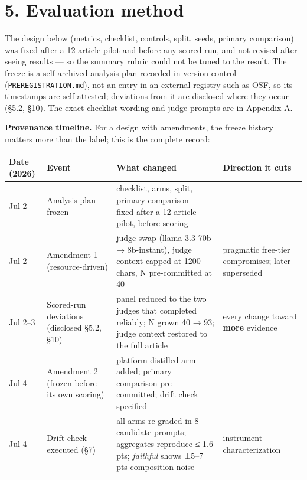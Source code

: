 \documentclass[11pt]{article}
\begin{document}
\section{5. Evaluation method}\label{evaluation-method}

The design below (metrics, checklist, controls, split, seeds, primary
comparison) was fixed after a 12-article pilot and before any scored
run, and not revised after seeing results --- so the summary rubric
could not be tuned to the result. The freeze is a self-archived analysis
plan recorded in version control (\texttt{PREREGISTRATION.md}), not an
entry in an external registry such as OSF, so its timestamps are
self-attested; deviations from it are disclosed where they occur (§5.2,
§10). The exact checklist wording and judge prompts are in Appendix A.

\textbf{Provenance timeline.} For a design with amendments, the freeze
history matters more than the label; this is the complete record:

\begin{longtable}[]{@{}
  >{\raggedright\arraybackslash}p{}
  >{\raggedright\arraybackslash}p{}
  >{\raggedright\arraybackslash}p{}
  >{\raggedright\arraybackslash}p{}@{}}
\toprule\noalign{}
\begin{minipage}[b]{\linewidth}\raggedright
Date (2026)
\end{minipage} & \begin{minipage}[b]{\linewidth}\raggedright
Event
\end{minipage} & \begin{minipage}[b]{\linewidth}\raggedright
What changed
\end{minipage} & \begin{minipage}[b]{\linewidth}\raggedright
Direction it cuts
\end{minipage} \\
\midrule\noalign{}
\endhead
\bottomrule\noalign{}
\endlastfoot
Jul 2 & Analysis plan frozen & checklist, arms, split, primary
comparison --- fixed after a 12-article pilot, before scoring & --- \\
Jul 2 & Amendment 1 (resource-driven) & judge swap (llama-3.3-70b →
8b-instant), judge context capped at 1200 chars, N pre-committed at 40 &
pragmatic free-tier compromises; later superseded \\
Jul 2--3 & Scored-run deviations (disclosed §5.2, §10) & panel reduced
to the two judges that completed reliably; N grown 40 → 93; judge
context restored to the full article & every change toward \textbf{more}
evidence \\
Jul 4 & Amendment 2 (frozen before its own scoring) & platform-distilled
arm added; primary comparison pre-committed; drift check specified &
--- \\
Jul 4 & Drift check executed (§7) & all arms re-graded in 8-candidate
prompts; aggregates reproduce ≤ 1.6 pts; \emph{faithful} shows ±5--7 pts
composition noise & instrument characterization \\
\end{longtable}
\end{document}
